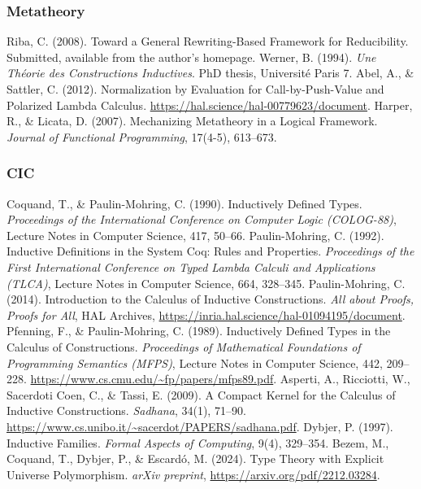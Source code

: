 \documentclass{article}
\begin{document}
\begin{thebibliography}{9}
\subsubsection*{Metatheory}
 Riba, C. (2008). Toward a General Rewriting-Based Framework for Reducibility. Submitted, available from the author’s homepage.
 Werner, B. (1994). \emph{Une Théorie des Constructions Inductives}. PhD thesis, Université Paris 7.
 Abel, A., \& Sattler, C. (2012). Normalization by Evaluation for Call-by-Push-Value and Polarized Lambda Calculus. \url{https://hal.science/hal-00779623/document}.
 Harper, R., \& Licata, D. (2007). Mechanizing Metatheory in a Logical Framework. \emph{Journal of Functional Programming}, 17(4-5), 613--673.
\newpage
\subsubsection*{CIC}
 Coquand, T., \& Paulin-Mohring, C. (1990). Inductively Defined Types. \emph{Proceedings of the International Conference on Computer Logic (COLOG-88)}, Lecture Notes in Computer Science, 417, 50--66.
 Paulin-Mohring, C. (1992). Inductive Definitions in the System Coq: Rules and Properties. \emph{Proceedings of the First International Conference on Typed Lambda Calculi and Applications (TLCA)}, Lecture Notes in Computer Science, 664, 328--345.
 Paulin-Mohring, C. (2014). Introduction to the Calculus of Inductive Constructions. \emph{All about Proofs, Proofs for All}, HAL Archives, \url{https://inria.hal.science/hal-01094195/document}.
 Pfenning, F., \& Paulin-Mohring, C. (1989). Inductively Defined Types in the Calculus of Constructions. \emph{Proceedings of Mathematical Foundations of Programming Semantics (MFPS)}, Lecture Notes in Computer Science, 442, 209--228. \url{https://www.cs.cmu.edu/~fp/papers/mfps89.pdf}.
 Asperti, A., Ricciotti, W., Sacerdoti Coen, C., \& Tassi, E. (2009). A Compact Kernel for the Calculus of Inductive Constructions. \emph{Sadhana}, 34(1), 71--90. \url{https://www.cs.unibo.it/~sacerdot/PAPERS/sadhana.pdf}.
 Dybjer, P. (1997). Inductive Families. \emph{Formal Aspects of Computing}, 9(4), 329--354.
 Bezem, M., Coquand, T., Dybjer, P., \& Escardó, M. (2024). Type Theory with Explicit Universe Polymorphism. \emph{arXiv preprint}, \url{https://arxiv.org/pdf/2212.03284}.

\end{thebibliography}
\end{document}
